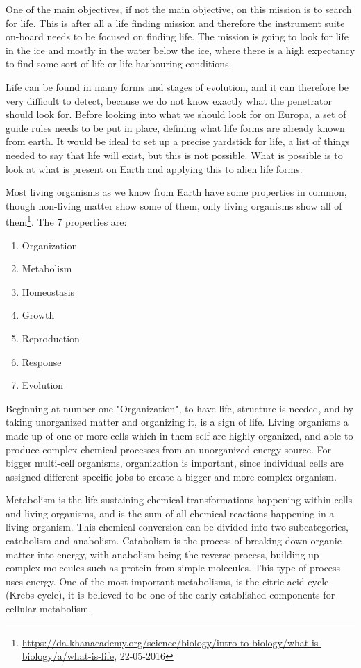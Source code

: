 
One of the main objectives, if not the main objective, on this mission is to search for life. This is after all a life finding mission and therefore the instrument suite on-board needs to be focused on finding life. The mission is going to look for life in the ice and mostly in the water below the ice, where there is a high expectancy to find some sort of life or life harbouring conditions.

Life can be found in many forms and stages of evolution, and it can therefore be very difficult to detect, because we do not know exactly what the penetrator should look for. Before looking into what we should look for on Europa, a set of guide rules needs to be put in place, defining what life forms are already known from earth. It would be ideal to set up a precise yardstick for life, a list of things needed to say that life will exist, but this is not possible. What is possible is to look at what is present on Earth and applying this to alien life forms.

Most living organisms as we know from Earth have some properties in common, though non-living matter show some of them, only living organisms show all of them\footnote{\url{https://da.khanacademy.org/science/biology/intro-to-biology/what-is-biology/a/what-is-life}, 22-05-2016}. The 7 properties are:
\begin{enumerate}
  \item Organization
  \item Metabolism
  \item Homeostasis
  \item Growth
  \item Reproduction
  \item Response
  \item Evolution
\end{enumerate}

\noindent
Beginning at number one "Organization", to have life, structure is needed, and by taking unorganized matter and organizing it, is a sign of life. Living organisms a made up of one or more cells which in them self are highly organized, and able to produce complex chemical processes from an unorganized energy source. For bigger multi-cell organisms, organization is important, since individual cells are assigned different specific jobs to create a bigger and more complex organism.

Metabolism is the life sustaining chemical transformations happening within cells and living organisms, and is the sum of all chemical reactions happening in a living organism. This chemical conversion can be divided into two subcategories, catabolism and anabolism. Catabolism is the process of breaking down organic matter into energy, with anabolism being the reverse process, building up complex molecules such as protein from simple molecules. This type of process uses energy. One of the most important metabolisms, is the citric acid cycle (Krebs cycle), it is believed to be one of the early established components for cellular metabolism.

